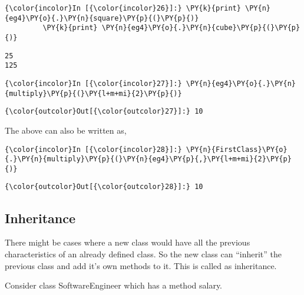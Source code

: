     \begin{Verbatim}[commandchars=\\\{\}]
{\color{incolor}In [{\color{incolor}26}]:} \PY{k}{print} \PY{n}{eg4}\PY{o}{.}\PY{n}{square}\PY{p}{(}\PY{p}{)}
         \PY{k}{print} \PY{n}{eg4}\PY{o}{.}\PY{n}{cube}\PY{p}{(}\PY{p}{)}
\end{Verbatim}

    \begin{Verbatim}[commandchars=\\\{\}]
25
125
    \end{Verbatim}

    \begin{Verbatim}[commandchars=\\\{\}]
{\color{incolor}In [{\color{incolor}27}]:} \PY{n}{eg4}\PY{o}{.}\PY{n}{multiply}\PY{p}{(}\PY{l+m+mi}{2}\PY{p}{)}
\end{Verbatim}

            \begin{Verbatim}[commandchars=\\\{\}]
{\color{outcolor}Out[{\color{outcolor}27}]:} 10
\end{Verbatim}
        
    The above can also be written as,

    \begin{Verbatim}[commandchars=\\\{\}]
{\color{incolor}In [{\color{incolor}28}]:} \PY{n}{FirstClass}\PY{o}{.}\PY{n}{multiply}\PY{p}{(}\PY{n}{eg4}\PY{p}{,}\PY{l+m+mi}{2}\PY{p}{)}
\end{Verbatim}

            \begin{Verbatim}[commandchars=\\\{\}]
{\color{outcolor}Out[{\color{outcolor}28}]:} 10
\end{Verbatim}
        
    \subsection{Inheritance}\label{inheritance}

    There might be cases where a new class would have all the previous
characteristics of an already defined class. So the new class can
``inherit'' the previous class and add it's own methods to it. This is
called as inheritance.

    Consider class SoftwareEngineer which has a method salary.

